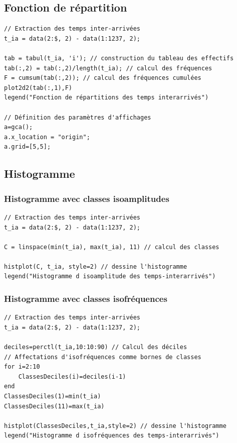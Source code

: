 \documentclass{article}
\begin{document}
\subsection{Fonction de répartition}
\begin{verbatim}
// Extraction des temps inter-arrivées
t_ia = data(2:$, 2) - data(1:1237, 2);

tab = tabul(t_ia, 'i'); // construction du tableau des effectifs
tab(:,2) = tab(:,2)/length(t_ia); // calcul des fréquences
F = cumsum(tab(:,2)); // calcul des fréquences cumulées
plot2d2(tab(:,1),F)
legend("Fonction de répartitions des temps interarrivés")

// Définition des paramètres d'affichages
a=gca();
a.x_location = "origin";
a.grid=[5,5];

\end{verbatim}

\subsection{Histogramme}
\subsubsection{Histogramme avec classes isoamplitudes}
\begin{verbatim}
// Extraction des temps inter-arrivées
t_ia = data(2:$, 2) - data(1:1237, 2);

C = linspace(min(t_ia), max(t_ia), 11) // calcul des classes

histplot(C, t_ia, style=2) // dessine l'histogramme
legend("Histogramme d isoamplitude des temps-interarrivés")
\end{verbatim}
\subsubsection{Histogramme avec classes isofréquences}
\begin{verbatim}
// Extraction des temps inter-arrivées
t_ia = data(2:$, 2) - data(1:1237, 2);

deciles=perctl(t_ia,10:10:90) // Calcul des déciles
// Affectations d'isofréquences comme bornes de classes
for i=2:10
    ClassesDeciles(i)=deciles(i-1)
end
ClassesDeciles(1)=min(t_ia)
ClassesDeciles(11)=max(t_ia)

histplot(ClassesDeciles,t_ia,style=2) // dessine l'histogramme
legend("Histogramme d isofréquences des temps-interarrivés")
\end{verbatim}
\end{document}
